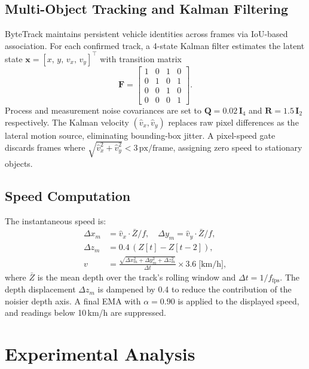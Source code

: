 \documentclass[conference]{IEEEtran}
\begin{document}
\subsection{Multi-Object Tracking and Kalman Filtering}
ByteTrack \cite{zhang2022bytetrack} maintains persistent
vehicle identities across frames via IoU-based association.
For each confirmed track, a 4-state Kalman filter
\cite{khodarahmi2023kalman} estimates the latent state
$\mathbf{x} = [x,\,y,\,v_x,\,v_y]^\top$ with transition
matrix
\begin{equation}
  \mathbf{F} =
  \begin{bmatrix}
    1 & 0 & 1 & 0 \\
    0 & 1 & 0 & 1 \\
    0 & 0 & 1 & 0 \\
    0 & 0 & 0 & 1
  \end{bmatrix}.
\end{equation}
Process and measurement noise covariances are set to
$\mathbf{Q} = 0.02\,\mathbf{I}_4$ and
$\mathbf{R} = 1.5\,\mathbf{I}_2$ respectively. The Kalman
velocity $(\hat{v}_x, \hat{v}_y)$ replaces raw pixel
differences as the lateral motion source, eliminating
bounding-box jitter. A pixel-speed gate discards frames
where $\sqrt{\hat{v}_x^2+\hat{v}_y^2} < 3\,\text{px/frame}$,
assigning zero speed to stationary objects.

\subsection{Speed Computation}
The instantaneous speed is:
\begin{align}
  \Delta x_m &= \hat{v}_x \cdot \bar{Z} / f, \quad
  \Delta y_m  = \hat{v}_y \cdot \bar{Z} / f, \\
  \Delta z_m &= 0.4\,(Z[t] - Z[t-2]), \\
  v           &= \frac{\sqrt{\Delta x_m^2 + \Delta y_m^2 +
                  \Delta z_m^2}}{\Delta t} \times 3.6
                \;\text{[km/h]},
\end{align}
where $\bar{Z}$ is the mean depth over the track's rolling
window and $\Delta t = 1/f_{\text{fps}}$. The depth
displacement $\Delta z_m$ is dampened by 0.4 to reduce the
contribution of the noisier depth axis. A final EMA with
$\alpha=0.90$ is applied to the displayed speed, and readings
below 10\,km/h are suppressed.

\section{Experimental Analysis}
\end{document}
